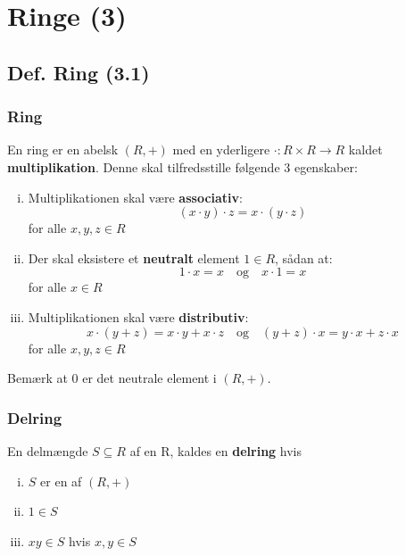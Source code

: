 \section{Ringe (3)}
\subsection{Def. Ring (3.1)}
\label{Def. Ring}
\subsubsection{Ring}
\label{Ring}
En ring er en abelsk  $(R,+)$ med en yderligere
 $\cdot: R \times R \rightarrow R$ kaldet
\textbf{multiplikation}. Denne skal tilfredsstille følgende 3 egenskaber:

\begin{enumerate}[(i)]
  \item Multiplikationen skal være \textbf{associativ}:
  \begin{equation*}
  (x \cdot y) \cdot z = x \cdot (y \cdot z)
  \end{equation*}
  for alle $x,y,z \in R$
  
  \item Der skal eksistere et \textbf{neutralt} element $1 \in R$, sådan at:
  \begin{equation*}
  1 \cdot x = x \quad \text{og}\quad x \cdot 1 = x
  \end{equation*}
  for alle $x \in R$
  
  \item Multiplikationen skal være \textbf{distributiv}:
  \begin{equation*}
  x \cdot(y + z) = x \cdot y + x \cdot z \quad \text{og}\quad (y + z) \cdot x =
  y \cdot x + z \cdot x
  \end{equation*}
  for alle $x,y,z \in R$
\end{enumerate}
Bemærk at 0 er det neutrale element i $(R, +)$.

\subsubsection{Delring}
\label{Delring}
En delmængde $S \subseteq R$ af en  R, kaldes en \textbf{delring}
hvis
\begin{enumerate}[(i)]
  \item $S$ er en  af $(R, +)$
  \item $1 \in S$
  \item $xy \in S$ hvis $x, y \in S$
\end{enumerate}

